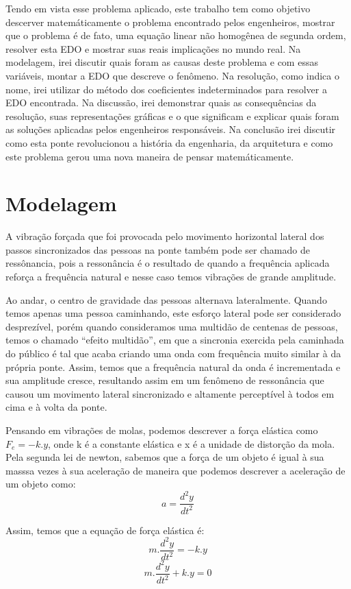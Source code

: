 \documentclass[]{article}
\begin{document}
Tendo em vista esse problema aplicado, este trabalho tem como objetivo descerver matemáticamente
o problema encontrado pelos engenheiros, mostrar que o problema é de fato, uma equação linear não 
homogênea de segunda ordem, resolver esta EDO e mostrar suas reais implicações no mundo real.
Na modelagem, irei discutir quais foram as causas deste problema e com essas variáveis, montar a EDO que
descreve o fenômeno. Na resolução, como indica o nome, irei utilizar do método dos coeficientes indeterminados
para resolver a EDO encontrada. Na discussão, irei demonstrar quais as consequências da resolução, suas representações
gráficas e o que significam e explicar quais foram as soluções aplicadas pelos engenheiros responsáveis.
Na conclusão irei discutir como esta ponte revolucionou a história da engenharia, da arquitetura e 
como este problema gerou uma nova maneira de pensar matemáticamente.

\pagebreak 
\section{Modelagem}

A vibração forçada que foi provocada pelo movimento horizontal lateral dos passos sincronizados das pessoas na ponte também pode ser 
chamado de ressônancia, pois a ressonância  é o resultado de quando a frequência aplicada reforça a frequência natural e nesse caso temos vibrações de grande amplitude.

Ao andar, o centro de gravidade das pessoas alternava lateralmente. 
Quando temos apenas uma pessoa caminhando, este esforço lateral pode ser considerado 
desprezível, porém quando consideramos uma multidão de centenas de pessoas, temos o 
chamado “efeito multidão”, em que a sincronia exercida pela caminhada do público é tal 
que acaba criando uma onda com frequência muito similar à da própria ponte. Assim, 
temos que a frequência natural da onda é incrementada e sua amplitude cresce, 
resultando assim em um fenômeno de ressonância que causou um movimento lateral 
sincronizado e altamente perceptível à todos em cima e à volta da ponte.

Pensando em vibrações de molas, podemos descrever a força elástica como $F_e = -k.y$, onde k é a
constante elástica e x é a unidade de distorção da mola. Pela segunda lei de newton, sabemos que a força de um
objeto é igual à sua masssa vezes à sua aceleração de maneira que podemos descrever a aceleração de um objeto como:
\[ a = \frac{d^2 y}{d t^2} \]

Assim, temos que a equação de força elástica é:
\[ m.\frac{d^2 y}{d t^2} = -k.y \]
\[ m.\frac{d^2 y}{d t^2} + k.y = 0\]
\end{document}
